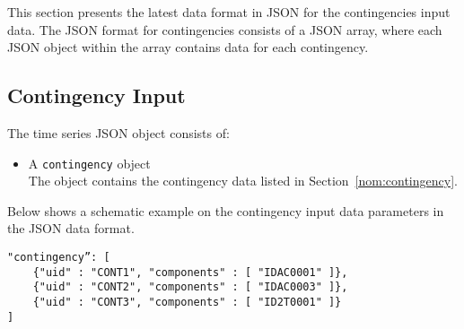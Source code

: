 \label{sec:contingency}
This section presents the latest data format in JSON for the contingencies input data.
The JSON format for contingencies consists of a JSON array,
where each JSON object within the array contains data for each contingency.

\subsection{Contingency Input}
\label{sec:input_data}
The time series JSON object consists of:
\begin{itemize}
    \item A \texttt{contingency} object\\
        The object contains the contingency data listed in Section~\ref{nom:contingency}.
\end{itemize}


Below shows a schematic example on the contingency input data parameters in the JSON data format.
\begin{verbatim}
"contingency”: [
    {"uid" : "CONT1", "components" : [ "IDAC0001" ]},
    {"uid" : "CONT2", "components" : [ "IDAC0003" ]},
    {"uid" : "CONT3", "components" : [ "ID2T0001" ]}
]
\end{verbatim}

